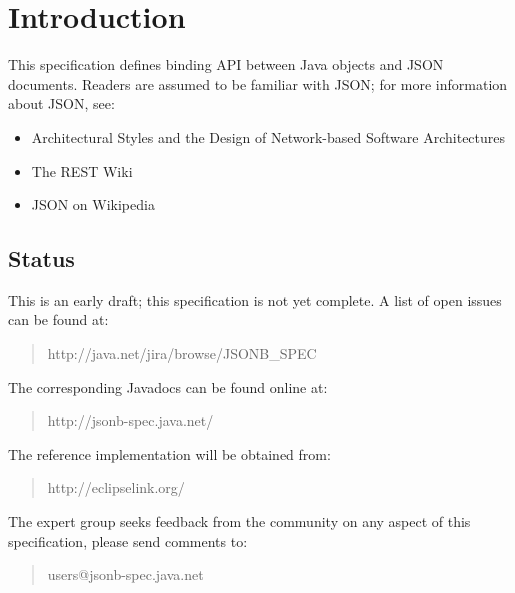 \chapter{Introduction}

This specification defines binding API between Java objects and JSON \cite{rfc7159} documents. Readers are assumed to be familiar with JSON; for more information about JSON, see:

\begin{itemize}
\item Architectural Styles and the Design of Network-based Software Architectures\cite{rest}
\item The REST Wiki\cite{restwiki}
\item JSON on Wikipedia\cite{jsonwikipedia}
\end{itemize}

\section{Status}
\label{status}

This is an early draft; this specification is not yet complete. A list of open issues can be found at:


\begin{quote}
http://java.net/jira/browse/JSONB\_SPEC
\end{quote}

The corresponding Javadocs can be found online at:

\begin{quote}
http://jsonb-spec.java.net/
\end{quote}

The reference implementation will be obtained from:

\begin{quote}
http://eclipselink.org/
\end{quote}

The expert group seeks feedback from the community on any aspect of this specification, please send comments to:

\begin{quote}
users@jsonb-spec.java.net
\end{quote}

